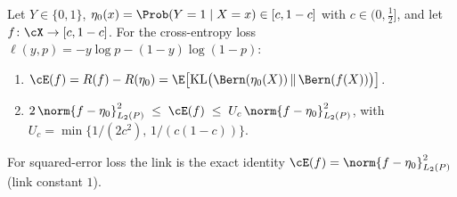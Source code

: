 
\begin{lemma}\label{lem:loss-norm}
Let $Y \in \{0,1\}$, $\eta_0(x) = \Prob(Y=1 \mid X=x) \in [c,1-c]$ with
$c \in (0,\tfrac12]$, and let $f \colon \cX \to [c,1-c]$. For the cross-entropy
loss $\ell(y,p) = -y \log p - (1-y)\log(1-p)$:
\begin{enumerate}
\item[(i)] $\cE(f) = R(f) - R(\eta_0)
  = \E\bigl[\mathrm{KL}\bigl(\Bern(\eta_0(X)) \,\|\, \Bern(f(X))\bigr)\bigr]$.
\item[(ii)] $2\,\norm{f - \eta_0}_{L_2(P)}^2 \;\le\; \cE(f)
  \;\le\; U_c\, \norm{f - \eta_0}_{L_2(P)}^2$, with
  $U_c = \min\{1/(2c^2),\, 1/(c(1-c))\}$.
\end{enumerate}
For squared-error loss the link is the exact identity
$\cE(f) = \norm{f - \eta_0}_{L_2(P)}^2$ (link constant $1$).
\end{lemma}

